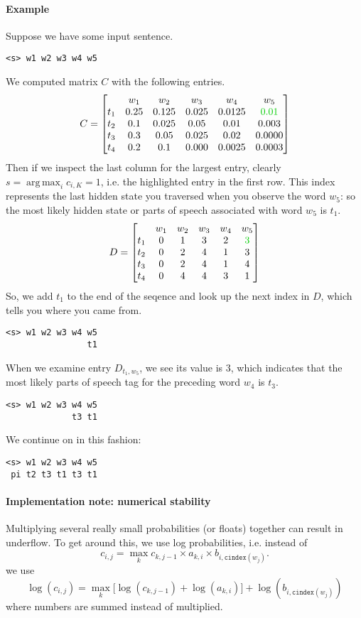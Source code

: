 \documentclass[12pt]{article}
\DeclareMathOperator*{\argmax}{arg\,max}
\begin{document}
\paragraph{Example} Suppose we have some input sentence.
\begin{verbatim}
<s> w1 w2 w3 w4 w5
\end{verbatim}
We computed matrix $C$ with the following entries.
\[
  C = \begin{bmatrix}
        & w_1 & w_2 & w_3 & w_4 & w_5 \\
    t_1 & 0.25 & 0.125 & 0.025 & 0.0125 & {\color{green!80!black} 0.01} \\
    t_2 & 0.1 & 0.025 & 0.05 & 0.01 & 0.003 \\
    t_3 & 0.3 & 0.05 & 0.025 & 0.02 & 0.0000 \\
    t_4 & 0.2 & 0.1 & 0.000 & 0.0025 & 0.0003    
  \end{bmatrix}
\]
Then if we inspect the last column for the largest entry, clearly $s = \argmax_i c_{i, K} = 1$, i.e. the highlighted entry in the first row. This index represents the last hidden state you traversed when you observe the word $w_5$: so the most likely hidden state or parts of speech associated with word $w_5$ is $t_1$. 
\[
  D = \begin{bmatrix}
        & w_1 & w_2 & w_3 & w_4 & w_5 \\
    t_1 & 0 & 1 & 3 & 2 & {\color{green!80!black} 3} \\
    t_2 & 0 & 2 & 4 & 1 & 3 \\
    t_3 & 0 & 2 & 4 & 1 & 4 \\
    t_4 & 0 & 4 & 4 & 3 & 1    
  \end{bmatrix}
\]
So, we add $t_1$ to the end of the seqence and look up the next index in $D$, which tells you where you came from.
\begin{verbatim}
<s> w1 w2 w3 w4 w5
                t1
\end{verbatim}
When we examine entry $D_{t_1, w_5}$, we see its value is 3, which indicates that the most likely parts of speech tag for the preceding word $w_4$ is $t_3$.
\begin{verbatim}
<s> w1 w2 w3 w4 w5
             t3 t1
\end{verbatim}
We continue on in this fashion: 
\begin{verbatim}
<s> w1 w2 w3 w4 w5
 pi t2 t3 t1 t3 t1
\end{verbatim}

\paragraph{Implementation note: numerical stability} Multiplying several really small probabilities (or floats) together can result in underflow. To get around this, we use log probabilities, i.e. instead of
\[
  c_{i,j} = \max_k c_{k, j-1} \times a_{k,i} \times b_{i, \texttt{cindex}(w_j)}.
\]
we use
\[
  \log (c_{i,j}) = \max_k \bigg [\log (c_{k, j-1}) + \log (a_{k,i})\bigg ] + \log( b_{i, \texttt{cindex}(w_j)})
\]
where numbers are summed instead of multiplied.
\end{document}
